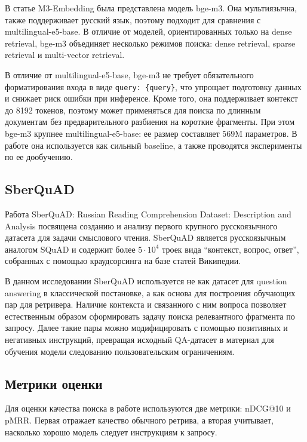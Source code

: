 \documentclass[12pt, a4paper, oneside]{article}
\begin{document}
В статье M3-Embedding \cite{chen2025m3embeddingmultilingualitymultifunctionalitymultigranularity} была представлена модель 
bge-m3. Она мультиязычна, также поддерживает русский язык, поэтому подходит для сравнения с 
multilingual-e5-base. В отличие от моделей, ориентированных только на 
dense retrieval, bge-m3 объединяет несколько режимов поиска: dense retrieval, sparse retrieval и 
multi-vector retrieval.

В отличие от multilingual-e5-base, bge-m3 не требует 
обязательного форматирования входа в виде \texttt{query: \{query\}}, что упрощает 
подготовку данных и снижает риск ошибки при инференсе. Кроме того, она поддерживает 
контекст до 8192 токенов, поэтому может применяться для поиска по длинным документам без 
предварительного разбиения на короткие фрагменты. При этом bge-m3 крупнее multilingual-e5-base: 
ее размер составляет $569$M параметров. В работе она используется как сильный baseline, 
а также проводятся эксперименты по ее дообучению. 

\subsection{SberQuAD}

Работа SberQuAD: Russian Reading Comprehension Dataset: 
Description and Analysis \cite{sberquad} посвящена 
созданию и анализу первого крупного русскоязычного датасета 
для задачи смыслового чтения. SberQuAD является русскоязычным аналогом 
SQuAD и содержит более $5 \cdot 10^4$ троек вида ``контекст, вопрос, ответ'', 
собранных с помощью краудсорсинга на базе статей Википедии.

В данном исследовании SberQuAD используется не как датасет 
для question answering в классической постановке, а как основа для построения 
обучающих пар для ретривера. Наличие контекста и связанного с ним вопроса позволяет 
естественным образом сформировать задачу поиска релевантного фрагмента по запросу. Далее 
такие пары можно модифицировать с помощью позитивных и негативных инструкций, превращая исходный 
QA-датасет в материал для обучения модели следованию пользовательским ограничениям.

\subsection{Метрики оценки}

Для оценки качества поиска в работе используются две метрики: nDCG@10 и pMRR. 
Первая отражает качество обычного ретрива, а вторая учитывает, насколько 
хорошо модель следует инструкциям к запросу. 
\end{document}
